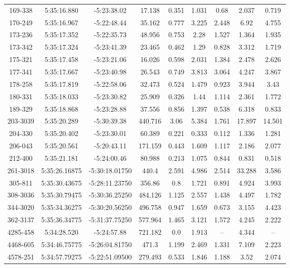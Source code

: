 \begin{table}
\begin{tabular}{ccccccccc}
169-338 & 5:35:16.880 & -5:23:38.02 & 17.138 & 0.351 & 1.031 & 0.68 & 2.037 & 0.719 \\
170-249 & 5:35:16.967 & -5:22:48.44 & 35.162 & 0.777 & 3.225 & 2.448 & 6.92 & 4.755 \\
173-236 & 5:35:17.352 & -5:22:35.73 & 48.956 & 0.753 & 2.28 & 1.527 & 1.364 & 1.935 \\
173-342 & 5:35:17.324 & -5:23:41.39 & 23.465 & 0.462 & 1.29 & 0.828 & 3.312 & 1.719 \\
175-321 & 5:35:17.458 & -5:23:21.06 & 16.026 & 0.598 & 2.031 & 1.384 & 2.478 & 2.626 \\
177-341 & 5:35:17.667 & -5:23:40.98 & 26.543 & 0.749 & 3.813 & 3.064 & 4.247 & 3.867 \\
178-258 & 5:35:17.819 & -5:22:58.06 & 32.473 & 0.524 & 1.479 & 0.923 & 3.944 & 3.43 \\
180-331 & 5:35:18.033 & -5:23:30.82 & 25.909 & 0.326 & 1.44 & 1.114 & 2.361 & 1.772 \\
189-329 & 5:35:18.868 & -5:23:28.88 & 37.556 & 0.856 & 1.397 & 0.538 & 6.318 & 0.833 \\
203-3039 & 5:35:20.289 & -5:30:39.38 & 440.716 & 3.06 & 5.384 & 1.761 & 17.897 & 14.501 \\
204-330 & 5:35:20.402 & -5:23:30.01 & 60.389 & 0.221 & 0.333 & 0.112 & 1.336 & 1.281 \\
206-043 & 5:35:20.561 & -5:20:43.11 & 171.159 & 0.443 & 1.609 & 1.117 & 2.186 & 2.077 \\
212-400 & 5:35:21.181 & -5:24:00.46 & 80.988 & 0.213 & 1.075 & 0.844 & 0.831 & 0.518 \\
261-3018 & 5:35:26.16875 & -5:30:18.01750 & 440.4 & 2.591 & 4.986 & 2.514 & 33.288 & 3.586 \\
305-811 & 5:35:30.43675 & -5:28:11.23750 & 356.86 & 0.8 & 1.721 & 0.891 & 4.924 & 3.993 \\
308-3036 & 5:35:30.79475 & -5:30:36.25250 & 484.126 & 1.125 & 2.557 & 1.438 & 4.497 & 1.782 \\
344-3020 & 5:35:34.36275 & -5:30:20.56250 & 496.758 & 0.947 & 1.659 & 0.673 & 3.155 & 4.423 \\
362-3137 & 5:35:36.34775 & -5:31:37.75250 & 577.964 & 1.465 & 3.121 & 1.572 & 4.245 & 2.222 \\
4285-458 & 5:34:28.520 & -5:24:57.88 & 721.182 & 0.0 & 1.913 & -- & 4.344 & -- \\
4468-605 & 5:34:46.75775 & -5:26:04.81750 & 471.3 & 1.199 & 2.469 & 1.331 & 7.109 & 2.223 \\
4578-251 & 5:34:57.79275 & -5:22:51.09500 & 279.493 & 0.533 & 1.846 & 1.188 & 3.52 & 2.074 \\

\end{tabular}
\end{table}
